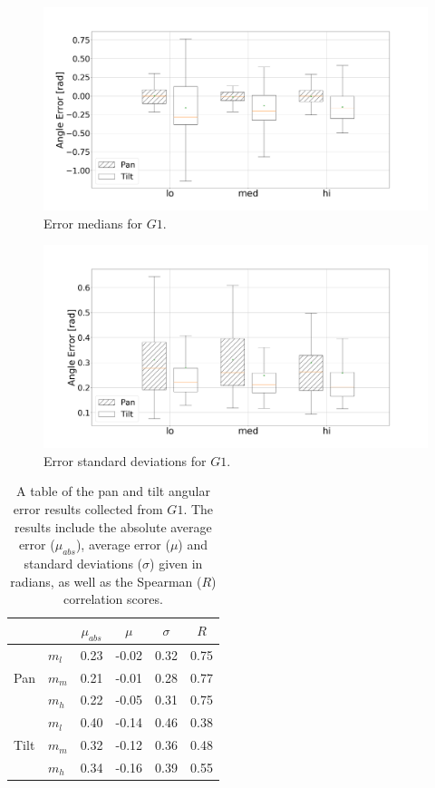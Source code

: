 \documentclass[sigconf, screen=true, anonymous=true]{acmart}
\begin{document}
\begin{figure}
  \centering
  \includegraphics[clip, trim=20 -70 100 100, width=0.8\columnwidth]{figures/err_boxplot_medians.png}
  \caption{Error medians for $G1$.}\label{fig:err-boxplot-median}
\end{figure}

\begin{figure}
  \centering
  \includegraphics[clip, trim=80 -70 100 0, width=0.8\columnwidth]{figures/err_boxplot_std.png}
  \caption{Error standard deviations for $G1$.}\label{fig:err-boxplot-std}
\end{figure}

\begin{table}
  \centering
  \caption{A table of the pan and tilt angular error results collected from $G1$. The results include the absolute average error ($\mu_{abs}$), average error ($\mu$) and standard deviations ($\sigma$) given in radians, as well as the Spearman ($R$) correlation scores.}\label{tab:results}
  \begin{tabular}{llcccc}
    \toprule
    \multicolumn{2}{c}{} & $\mu_{abs}$ & $\mu$ & $\sigma$ & $R$ \\\midrule
         & $m_l$ & 0.23 & -0.02 & 0.32 & 0.75 \\%
    Pan  & $m_m$ & 0.21 & -0.01 & 0.28 & 0.77 \\%
         & $m_h$ & 0.22 & -0.05 & 0.31 & 0.75 \\\midrule
         & $m_l$ & 0.40 & -0.14 & 0.46 & 0.38 \\%
    Tilt & $m_m$ & 0.32 & -0.12 & 0.36 & 0.48 \\%
         & $m_h$ & 0.34 & -0.16 & 0.39 & 0.55 \\
    \bottomrule
  \end{tabular}
\end{table}
\end{document}
